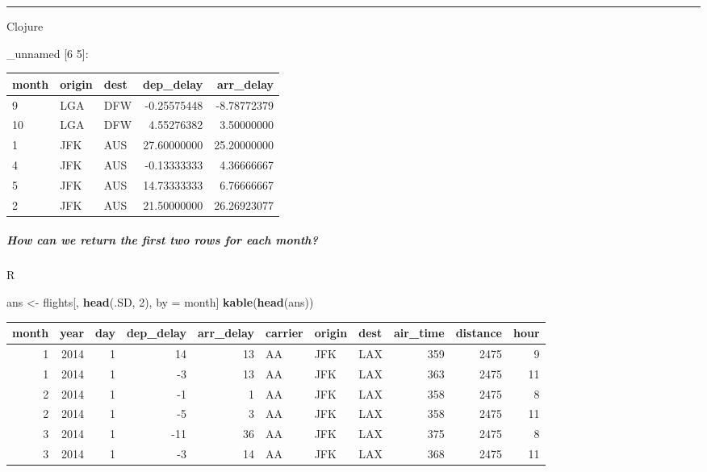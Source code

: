 \documentclass[]{article}
\newenvironment{Shaded}{\begin{snugshade}}{\end{snugshade}}
\newcommand{\KeywordTok}[1]{\textcolor[rgb]{0.13,0.29,0.53}{\textbf{#1}}}
\newcommand{\DecValTok}[1]{\textcolor[rgb]{0.00,0.00,0.81}{#1}}
\newcommand{\StringTok}[1]{\textcolor[rgb]{0.31,0.60,0.02}{#1}}
\newcommand{\VariableTok}[1]{\textcolor[rgb]{0.00,0.00,0.00}{#1}}
\newcommand{\NormalTok}[1]{#1}
\let\oldsubparagraph\subparagraph
\renewcommand{\subparagraph}[1]{\oldsubparagraph{#1}\mbox{}}
\begin{document}
\begin{center}\rule{0.5\linewidth}{0.5pt}\end{center}

Clojure

\begin{Shaded}
\end{Shaded}

\_unnamed {[}6 5{]}:

\begin{longtable}[]{@{}lllrr@{}}
\toprule
month & origin & dest & dep\_delay & arr\_delay\tabularnewline
\midrule
\endhead
9 & LGA & DFW & -0.25575448 & -8.78772379\tabularnewline
10 & LGA & DFW & 4.55276382 & 3.50000000\tabularnewline
1 & JFK & AUS & 27.60000000 & 25.20000000\tabularnewline
4 & JFK & AUS & -0.13333333 & 4.36666667\tabularnewline
5 & JFK & AUS & 14.73333333 & 6.76666667\tabularnewline
2 & JFK & AUS & 21.50000000 & 26.26923077\tabularnewline
\bottomrule
\end{longtable}

\subparagraph{How can we return the first two rows for each
month?}\label{how-can-we-return-the-first-two-rows-for-each-month}

R

\begin{Shaded}
\begin{Highlighting}[]
\NormalTok{ans <-}\StringTok{ }\NormalTok{flights[, }\KeywordTok{head}\NormalTok{(.SD, }\DecValTok{2}\NormalTok{), by =}\StringTok{ }\NormalTok{month]}
\KeywordTok{kable}\NormalTok{(}\KeywordTok{head}\NormalTok{(ans))}
\end{Highlighting}
\end{Shaded}

\begin{longtable}[]{@{}rrrrrlllrrr@{}}
\toprule
month & year & day & dep\_delay & arr\_delay & carrier & origin & dest &
air\_time & distance & hour\tabularnewline
\midrule
\endhead
1 & 2014 & 1 & 14 & 13 & AA & JFK & LAX & 359 & 2475 & 9\tabularnewline
1 & 2014 & 1 & -3 & 13 & AA & JFK & LAX & 363 & 2475 & 11\tabularnewline
2 & 2014 & 1 & -1 & 1 & AA & JFK & LAX & 358 & 2475 & 8\tabularnewline
2 & 2014 & 1 & -5 & 3 & AA & JFK & LAX & 358 & 2475 & 11\tabularnewline
3 & 2014 & 1 & -11 & 36 & AA & JFK & LAX & 375 & 2475 & 8\tabularnewline
3 & 2014 & 1 & -3 & 14 & AA & JFK & LAX & 368 & 2475 & 11\tabularnewline
\bottomrule
\end{longtable}
\end{document}
